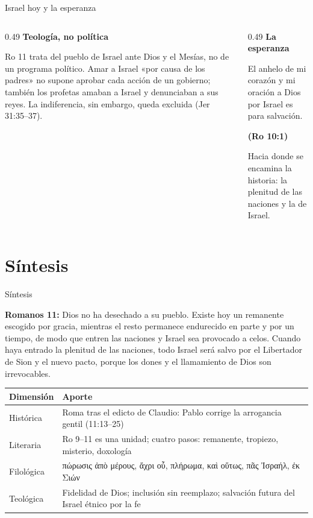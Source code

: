 \documentclass[hyperref={bookmarks=false},aspectratio=169]{beamer}
\newcommand{\grc}[1]{\foreignlanguage{ancientgreek}{#1}}
\newcommand{\fuente}[1]{\par\hfill{\upshape\bfseries\footnotesize\textcolor{ladrillo}{#1}}}
\newcommand{\notafig}[1]{\par\vspace{2pt}{\fontsize{5}{6}\selectfont\color{sepia}\hfill\textit{Nota.} #1\par}}
\newcommand{\elabpropia}{\notafig{Elaboración propia.}}
\begin{document}
\begin{frame}{Israel hoy y la esperanza}
\begin{columns}[T,onlytextwidth]
\begin{column}{0.49\textwidth}\small\RaggedRight
\textbf{\textcolor{cafe}{Teología, no política}}\par\smallskip
Ro 11 trata del pueblo de Israel ante Dios y el Mesías, no de un programa político. Amar a Israel «por causa de los padres» no supone aprobar cada acción de un gobierno; también los profetas amaban a Israel y denunciaban a sus reyes. La indiferencia, sin embargo, queda excluida (Jer 31:35--37).
\end{column}
\begin{column}{0.49\textwidth}
\textbf{\small\textcolor{cafe}{La esperanza}}\par\smallskip
\begin{cita}[fontupper=\scriptsize\itshape]El anhelo de mi corazón y mi oración a Dios por Israel es para salvación.\fuente{(Ro 10:1)}\end{cita}
\small Hacia donde se encamina la historia: la plenitud de las naciones y la de Israel.
\end{column}
\end{columns}
\end{frame}

\section{Síntesis}
\begin{frame}{Síntesis}
\begin{tcolorbox}[colback=piedra,colframe=ladrillo,boxrule=1pt,arc=3pt,fontupper=\small]
\textbf{\textcolor{cafe}{Romanos 11:}} Dios no ha desechado a su pueblo. Existe hoy un remanente escogido por gracia, mientras el resto permanece endurecido en parte y por un tiempo, de modo que entren las naciones y Israel sea provocado a celos. Cuando haya entrado la plenitud de las naciones, todo Israel será salvo por el Libertador de Sion y el nuevo pacto, porque los dones y el llamamiento de Dios son irrevocables.
\end{tcolorbox}
\scriptsize\renewcommand{\arraystretch}{1.2}
\begin{tabular}{>{\RaggedRight\arraybackslash}p{2.4cm}>{\RaggedRight\arraybackslash}p{8.9cm}}
\toprule
\color{ladrillo}\bfseries Dimensión & \color{ladrillo}\bfseries Aporte\\\midrule
Histórica & Roma tras el edicto de Claudio: Pablo corrige la arrogancia gentil (11:13--25)\\
Literaria & Ro 9--11 es una unidad; cuatro pasos: remanente, tropiezo, misterio, doxología\\
Filológica & \grc{πώρωσις ἀπὸ μέρους}, \grc{ἄχρι οὗ}, \grc{πλήρωμα}, \grc{καὶ οὕτως}, \grc{πᾶς Ἰσραήλ}, \grc{ἐκ Σιών}\\
Teológica & Fidelidad de Dios; inclusión sin reemplazo; salvación futura del Israel étnico por la fe\\
\bottomrule
\end{tabular}\par
\elabpropia
\end{frame}
\end{document}
